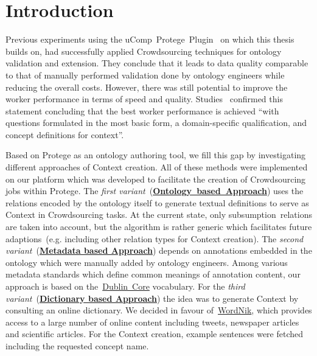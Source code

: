 \section{Introduction}\label{sec:approaches_introduction}
Previous experiments using the uComp~Protege~Plugin~\cite{wohlgenannt2016} on which this thesis builds on, had successfully applied Crowdsourcing techniques for ontology validation and extension. They conclude that it leads to data quality comparable to that of manually performed validation done by ontology engineers while reducing the overall costs. However, there was still potential to improve the worker performance in terms of speed and quality. 
Studies~\cite{mortensen2013} confirmed this statement concluding that the best worker performance is achieved
\enquote{with questions formulated in the most basic form, a domain-specific qualification, and concept definitions for context}.

Based on Protege as an ontology authoring tool, we fill this gap by investigating different approaches of Context creation. All of these methods were implemented on our platform which was developed to facilitate the creation of Crowdsourcing jobs within Protege.
The \emph{first variant}~(\hyperref[sec:enrichment_ontology_approach]{\textbf{Ontology~based~Approach}}) uses the relations encoded by the ontology itself to generate textual definitions to serve as Context in Crowdsourcing tasks. At the current state, only subsumption~relations are taken into account, but the algorithm is rather generic which facilitates future adaptions~(e.g. including other relation types for Context creation).
The \emph{second variant}~(\hyperref[sec:enrichment_metaData_approach]{\textbf{Metadata based Approach}}) depends on annotations embedded in the ontology which were manually added by ontology engineers. Among various metadata standards which define common meanings of annotation content, our approach is based on the~\hyperref[sec:dublin_core_metadata_vocabulary]{Dublin~Core} vocabulary.
For the \emph{third variant}~(\hyperref[sec:enrichment_dictionary_approach]{\textbf{Dictionary based Approach}}) the idea was to generate Context by consulting an online dictionary. We decided in favour of~\hyperref[sec:wordnik]{WordNik}, which provides access to a large number of online content including tweets, newspaper articles and scientific articles. For the Context creation, example sentences were fetched including the requested concept name. 